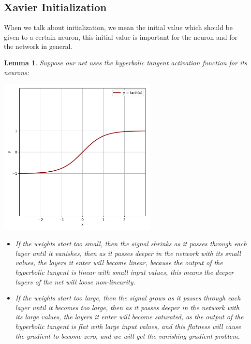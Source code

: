 \documentclass[12pt]{article}
\newtheorem{lemma}{Lemma}
\begin{document}
\subsection{\textbf{Xavier Initialization} \cite{DBLP:journals/jmlr/GlorotB10}}
When we talk about initialization, we mean the initial value which should be given to a certain neuron, this initial value is important for the neuron and for the network in general.\\
\begin{lemma}\label{lemma1}
Suppose our net uses the hyperbolic tangent activation function for its neurons:\\
\begin{center}
	\includegraphics[width=0.6\textwidth]{tanh}\\[1cm]
\end{center}
\begin{itemize}
	\item If the weights start too small, then the signal shrinks as it passes through each layer until it vanishes, then as it passes deeper in the network with its small values, the layers it enter will become linear, because the output of the hyperbolic tangent is linear with small input values, this means the deeper layers of the net will loose non-linearity.
	\item If the weights start too large, then the signal grows as it passes through each layer until it becomes too large, then as it passes deeper in the network with its large values, the layers it enter will become saturated, as the output of the hyperbolic tangent is flat with large input values, and this flatness will cause the gradient to become zero, and we will get the vanishing gradient problem.
\end{itemize}
\end{lemma}
\end{document}
